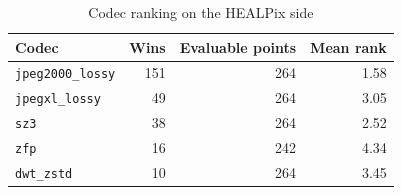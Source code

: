 \begin{table}[t]
\centering
\caption{Codec ranking on the HEALPix side}
\label{tab:codec_ranking}
\footnotesize
\setlength{\tabcolsep}{3pt}
\begin{tabular}{lrrr}
\toprule
Codec & Wins & Evaluable points & Mean rank \\
\midrule
\texttt{jpeg2000\_lossy} & 151 & 264 & 1.58 \\
\texttt{jpegxl\_lossy} & 49 & 264 & 3.05 \\
\texttt{sz3} & 38 & 264 & 2.52 \\
\texttt{zfp} & 16 & 242 & 4.34 \\
\texttt{dwt\_zstd} & 10 & 264 & 3.45 \\
\bottomrule
\end{tabular}
\end{table}

